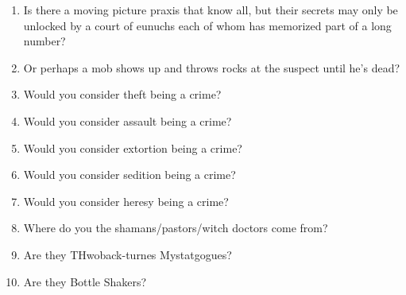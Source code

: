 \documentclass[10pt,a4paper]{article}
\begin{document}
\begin{enumerate}
		\item Is there a moving picture praxis that know all, but their secrets may only be unlocked by a court of eunuchs each of whom has memorized part of a long number?
		\item Or perhaps a mob shows up and throws rocks at the suspect until he's dead?
		\item Would you consider theft being a crime?
		\item Would you consider assault being a crime?
		\item Would you consider extortion being a crime?
		\item Would you consider sedition being a crime?
		\item Would you consider heresy being a crime?
		\item Where do you the shamans/pastors/witch doctors come from? 
		\item Are they THwoback-turnes Mystatgogues? 
		\item Are they Bottle Shakers?
	\end{enumerate}
	
\clearpage
\end{document}

